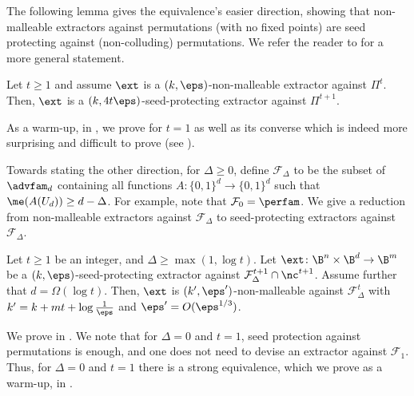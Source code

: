 \documentclass{toc}
\begin{document}
The following lemma gives the equivalence's easier direction, showing that non-malleable extractors against permutations (with no fixed points) are seed protecting against (non-colluding) permutations. We refer the reader to  for a more general statement.

\begin{lemma}\label{lem:intro nm is sp}
	Let $t \ge 1$ and assume $\ext$ is a $(k,\eps)$-non-malleable extractor
	against $\Pi^t$. Then, $\ext$ is a $(k,4t\eps)$-seed-protecting extractor against $\Pi^{t+1}$.
\end{lemma}

As a %
warm-up,  %
in , we prove  for $t=1$ as well as its converse which is indeed more surprising and difficult to prove (see ). 

Towards stating the other direction, 
for $\Delta \ge 0$, define $\mathcal{F}_{\Delta}$ to be the subset of $\advfam_d$ containing all functions $A \colon \{0,1\}^d \to \{0,1\}^d$ such that 
$\me(A(U_d)) \ge d-\Delta$. %
%
%
For example, note that $\mathcal{F}_0 = \perfam$. We
give a reduction from non-malleable extractors against $\mathcal{F}_\Delta$ to seed-protecting extractors against $\mathcal{F}_\Delta$. 

\begin{theorem}\label{thm:last one}
	Let $t \ge 1$ be an integer, and $\Delta \ge \max(1,\log{t})$.
	Let $\ext\colon\B^{n}\times\B^{d}\rightarrow\B^m$ be a $(k,\eps)$-seed-protecting extractor against $\mathcal{F}^{t+1}_{\Delta} \cap \nc^{t+1}$. Assume further that $d = \Omega(\log{t})$. Then, $\ext$ is $(k',\eps')$-non-malleable against $\mathcal{F}_{\Delta}^t$ with $k' = k+mt+\log\frac1{\eps}$ and $\eps' = O(\eps^{1/3})$.
\end{theorem}

We prove  in . 
We note that for $\Delta = 0$ and $t = 1$, seed protection against
permutations is enough, and one does not need to devise an extractor against $\mathcal{F}_1$.
Thus, for $\Delta = 0$ and $t = 1$ there is a strong equivalence, which we prove 
as a warm-up, in .


%

%



%
\end{document}
